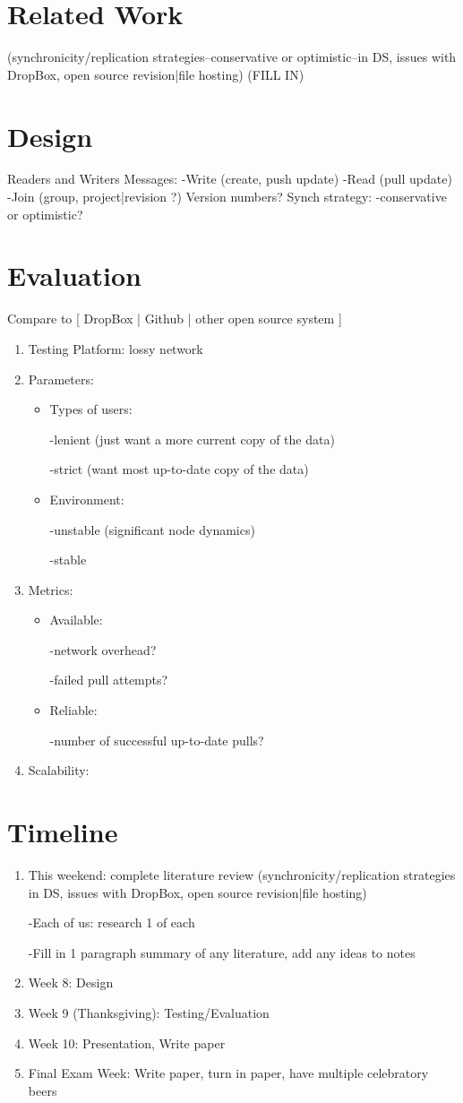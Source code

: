 \section{Related Work}
(synchronicity/replication strategies--conservative or optimistic--in DS, issues with DropBox, open source revision|file hosting)
(FILL IN)

\section{Design}
Readers and Writers
Messages:
-Write (create, push update)
-Read (pull update)
-Join (group, project|revision ?)
Version numbers?
Synch strategy:
-conservative or optimistic?
\section{Evaluation}
Compare to [ DropBox | Github | other open source system ]
\begin{enumerate}
\item Testing Platform:
lossy network
\item Parameters:
\begin{itemize}
\item Types of users:

-lenient (just want a more current copy of the data)

-strict (want most up-to-date copy of the data)
\item Environment:

-unstable (significant node dynamics)

-stable
\end{itemize}
\item Metrics:
\begin{itemize}
\item Available:

-network overhead?

-failed pull attempts?
\item Reliable:

-number of successful up-to-date pulls?
\end{itemize}
\item Scalability:
\end{enumerate}
\section{Timeline}
\begin{enumerate}
\item This weekend: complete literature review (synchronicity/replication strategies in DS, issues with DropBox, open source revision|file hosting)

-Each of us: research 1 of each

-Fill in 1 paragraph summary of any literature, add any ideas to notes

\item Week 8: Design
\item Week 9 (Thanksgiving): Testing/Evaluation
\item Week 10: Presentation, Write paper
\item Final Exam Week: Write paper, turn in paper, have multiple celebratory beers
\end{enumerate}
